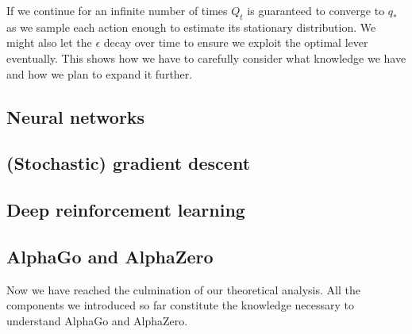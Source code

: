 If we continue for an infinite number of times $ Q_t $ is guaranteed to converge to $ q_{*} $ as we sample each action enough to estimate its stationary distribution. We might also let the $ \epsilon $ decay over time to ensure we exploit the optimal lever eventually. This shows how we have to carefully consider what knowledge we have and how we plan to expand it further.

\subsection{Neural networks}

\subsection{(Stochastic) gradient descent}

\subsection{Deep reinforcement learning}

\subsection{AlphaGo and AlphaZero}
Now we have reached the culmination of our theoretical analysis. All the components we introduced so far constitute the knowledge necessary to understand AlphaGo and AlphaZero.



